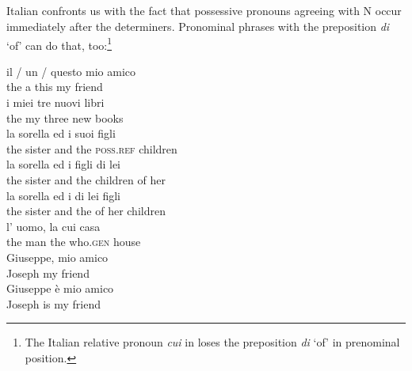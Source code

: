 \documentclass[output=paper,colorlinks,citecolor=brown]{langscibook}
\begin{document}
\subsection{} \label{sec:zi91:4.1}

Italian confronts us with the fact that possessive pronouns agreeing with N occur immediately after the determiners. Pronominal phrases with the preposition \textit{di} `of' can do that, too:\footnote{The Italian relative pronoun \textit{cui} in  loses the preposition \textit{di} ‘of’ in prenominal position.}

\ea \label{ex:zi91:22} 
    \gll il / un / questo mio amico \\
    the {} a {} this my friend \\
    \glt
\ex \label{ex:zi91:23}
    \gll i miei tre nuovi libri \\
    the my three new books \\
    \glt
\ex \label{ex:zi91:24}
    \ea \label{ex:zi91:24a}
        \gll la sorella ed i suoi figli \\
        the sister and the \textsc{poss.ref} children \\
        \glt 
    \ex \label{ex:zi91:24b}
        \gll la sorella ed i figli di lei \\
        the sister and the children of her \\
        \glt 
    \ex \label{ex:zi91:24c} 
        \gll la sorella ed i di lei figli \\
        the sister and the of her children \\
        \glt
    \z
\ex \label{ex:zi91:25} 
    \gll l' uomo, la cui casa \\
    the man the  who.\textsc{gen} house \\
    \glt 
\ex \label{ex:zi91:26}
    \gll Giuseppe, mio amico \\
    Joseph my friend \\
    \glt
\ex \label{ex:zi91:27}
    \gll Giuseppe è mio amico \\
    Joseph is my friend \\
    \glt 
\z
\end{document}
